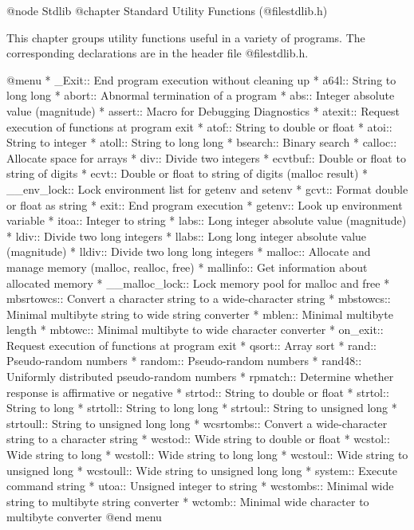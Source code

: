 @node Stdlib
@chapter Standard Utility Functions (@file{stdlib.h})

This chapter groups utility functions useful in a variety of programs.
The corresponding declarations are in the header file @file{stdlib.h}.

@menu 
* _Exit::       End program execution without cleaning up
* a64l::        String to long long
* abort::       Abnormal termination of a program
* abs::         Integer absolute value (magnitude)
* assert::      Macro for Debugging Diagnostics
* atexit::      Request execution of functions at program exit
* atof::        String to double or float
* atoi::        String to integer
* atoll::       String to long long
* bsearch::	Binary search
* calloc::      Allocate space for arrays
* div::         Divide two integers
* ecvtbuf::     Double or float to string of digits
* ecvt::        Double or float to string of digits (malloc result)
* __env_lock::		Lock environment list for getenv and setenv
* gcvt::        Format double or float as string
* exit::        End program execution
* getenv::      Look up environment variable
* itoa::        Integer to string
* labs::        Long integer absolute value (magnitude)
* ldiv::        Divide two long integers
* llabs::       Long long integer absolute value (magnitude)
* lldiv::       Divide two long long integers
* malloc::      Allocate and manage memory (malloc, realloc, free)
* mallinfo::	Get information about allocated memory
* __malloc_lock::	Lock memory pool for malloc and free
* mbsrtowcs::	Convert a character string to a wide-character string
* mbstowcs::	Minimal multibyte string to wide string converter
* mblen::	Minimal multibyte length
* mbtowc::      Minimal multibyte to wide character converter
* on_exit::     Request execution of functions at program exit
* qsort::	Array sort
* rand::        Pseudo-random numbers
* random::      Pseudo-random numbers
* rand48::      Uniformly distributed pseudo-random numbers
* rpmatch::     Determine whether response is affirmative or negative
* strtod::      String to double or float
* strtol::      String to long
* strtoll::     String to long long
* strtoul::     String to unsigned long
* strtoull::    String to unsigned long long
* wcsrtombs::	Convert a wide-character string to a character string
* wcstod::      Wide string to double or float
* wcstol::      Wide string to long
* wcstoll::     Wide string to long long
* wcstoul::     Wide string to unsigned long
* wcstoull::    Wide string to unsigned long long
* system::      Execute command string
* utoa::        Unsigned integer to string
* wcstombs::	Minimal wide string to multibyte string converter
* wctomb::      Minimal wide character to multibyte converter
@end menu

